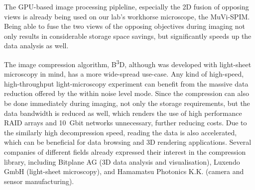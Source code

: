 \documentclass{booklet_style}
\def\b3d{B\textsuperscript{3}D}
\begin{document}
  The GPU-based image processing pipleline, especially the 2D fusion of opposing views is already being used on our lab's workhorse microscope, the MuVi-SPIM. Being able to fuse the two views of the opposing objectives during imaging not only results in considerable storage space savings, but significantly speeds up the data analysis as well.

  The image compression algorithm, \b3d, although was developed with light-sheet microscopy in mind, has a more wide-spread use-case. Any kind of high-speed, high-throughput light-microscopy experiment can benefit from the massive data reduction offered by the within noise level mode. Since the compression can also be done immediately during imaging, not only the storage requirements, but the data bandwidth is reduced as well, which renders the use of high performance RAID arrays and \SI{10}{Gbit} networks unnecessary, further reducing costs.
  Due to the similarly high decompression speed, reading the data is also accelerated, which can be beneficial for data browsing and 3D rendering applications. Several companies of different fields already expressed their interest in the compression library, including Bitplane AG (3D data analysis and visualisation), Luxendo GmbH (light-sheet microscopy), and Hamamatsu Photonics K.K. (camera and sensor manufacturing).





\printbibliography[category=journal, title={The author's publications}, heading=secbib]

\nocite{jakus_genetic_2010,gyorffy_recurrenceonline:_2011,shi_combined_2014}
\printbibliography[category=others, title={The author's others publications}, heading=secbib, resetnumbers=5]

\printbibliography[category=conference, title={The author's conference presentations}, heading=secbib]

\newrefcontext
\printbibliography[notcategory=journal,notcategory=conference,notcategory=others, resetnumbers=true, title={References cited in the thesis}, heading=secbib]


\end{document}
